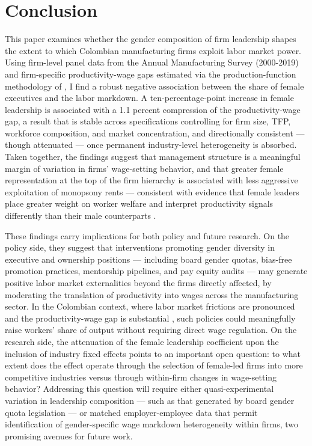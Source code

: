 \documentclass[12pt]{article}
\begin{document}
\section{Conclusion}\label{sec:conclusion}

This paper examines whether the gender composition of firm leadership shapes the extent to which Colombian manufacturing firms exploit labor market power. Using firm-level panel data from the Annual Manufacturing Survey (2000-2019) and firm-specific productivity-wage gaps estimated via the production-function methodology of \textcite{yeh_monopsony_2022}, I find a robust negative association between the share of female executives and the labor markdown. A ten-percentage-point increase in female leadership is associated with a 1.1 percent compression of the productivity-wage gap, a result that is stable across specifications controlling for firm size, TFP, workforce composition, and market concentration, and directionally consistent — though attenuated — once permanent industry-level heterogeneity is absorbed. Taken together, the findings suggest that management structure is a meaningful margin of variation in firms' wage-setting behavior, and that greater female representation at the top of the firm hierarchy is associated with less aggressive exploitation of monopsony rents — consistent with evidence that female leaders place greater weight on worker welfare and interpret productivity signals differently than their male counterparts \parencite{matsa_female_2013, flabbi_female_2017}.

These findings carry implications for both policy and future research. On the policy side, they suggest that interventions promoting gender diversity in executive and ownership positions — including board gender quotas, bias-free promotion practices, mentorship pipelines, and pay equity audits — may generate positive labor market externalities beyond the firms directly affected, by moderating the translation of productivity into wages across the manufacturing sector. In the Colombian context, where labor market frictions are pronounced and the productivity-wage gap is substantial \parencite{amodio_measuring_2024}, such policies could meaningfully raise workers' share of output without requiring direct wage regulation. On the research side, the attenuation of the female leadership coefficient upon the inclusion of industry fixed effects points to an important open question: to what extent does the effect operate through the selection of female-led firms into more competitive industries versus through within-firm changes in wage-setting behavior? Addressing this question will require either quasi-experimental variation in leadership composition — such as that generated by board gender quota legislation — or matched employer-employee data that permit identification of gender-specific wage markdown heterogeneity within firms, two promising avenues for future work.
\end{document}

